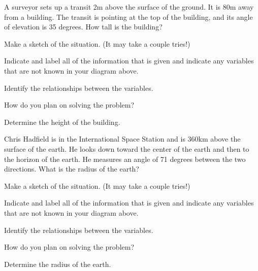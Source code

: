 \begin{problem}
\item A surveyor sets up a transit 2m above the surface of the
  ground. It is 80m away from a building. The transit is pointing at
  the top of the building, and its angle of elevation is 35
  degrees. How tall is the building?
  \begin{subproblem}
  \item Make a sketch of the situation. (It may take a couple tries!)
    \vfill
  \item Indicate and label all of the information that is given and
    indicate any variables that are not known in your diagram above.
  \item Identify the relationships between the variables.
    \vfill
    \vfill
  \item How do you plan on solving the problem?
    \vfill
  \item Determine the height of the building.
    \vfill
    \vfill
  \end{subproblem}

\clearpage

\item Chris Hadfield is in the International Space Station and is
  360km above the surface of the earth. He looks down toward the
  center of the earth and then to the horizon of the earth. He
  measures an angle of 71 degrees between the two directions. What is
  the radius of the earth?
  \begin{subproblem}
  \item Make a sketch of the situation. (It may take a couple tries!)
    \vfill
  \item Indicate and label all of the information that is given and
    indicate any variables that are not known in your diagram above.
  \item Identify the relationships between the variables.
    \vfill
    \vfill
  \item How do you plan on solving the problem?
    \vfill
  \item Determine the radius of the earth.
    \vfill
    \vfill
  \end{subproblem}

\end{problem}

\postClass

